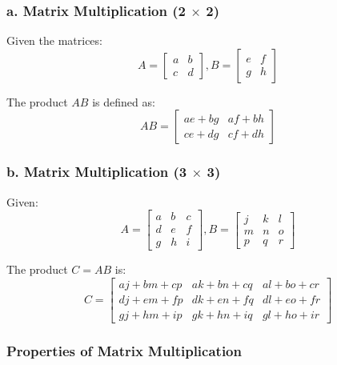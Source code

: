 \subsubsection*{a. Matrix Multiplication (2 $\times$ 2)}

Given the matrices:
$$ A = \begin{bmatrix} a & b \\ c & d \end{bmatrix},
   B = \begin{bmatrix} e & f \\ g & h \end{bmatrix}
$$

The product $AB$ is defined as:
$$  AB = \begin{bmatrix}
    ae + bg & af + bh \\
    ce + dg & cf + dh
    \end{bmatrix}
$$

\subsubsection*{b. Matrix Multiplication (3 $\times$ 3)}

Given:
$$  A = \begin{bmatrix} a & b & c \\ d & e & f \\ g & h & i \end{bmatrix},
    B = \begin{bmatrix} j & k & l \\ m & n & o \\ p & q & r \end{bmatrix}
$$

The product $C = AB$ is:
$$  C = \begin{bmatrix}
    aj+bm+cp & ak+bn+cq & al+bo+cr \\
    dj+em+fp & dk+en+fq & dl+eo+fr \\
    gj+hm+ip & gk+hn+iq & gl+ho+ir
    \end{bmatrix}
$$

\vspace{2cm}

\subsubsection*{Properties of Matrix Multiplication}

